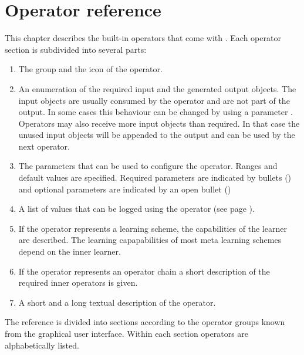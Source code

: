 \chapter{Operator reference}
\label{sec:operatorreference}

This chapter describes the built-in operators that come with
\rapidminer. Each operator section is subdivided into several parts:
\begin{enumerate}
\item The group and the icon of the operator.
\item An enumeration of the required input and the generated output
  objects. The input objects are usually consumed by the operator and
  are not part of the output. In some cases this behaviour can be changed by
  using a parameter . Operators may also receive more
  input objects than required. In that case the unused input objects will be
  appended to the output and can be used by the next operator.
\item The parameters that can be used to configure the
  operator. Ranges and default values are specified. Required parameters
  are indicated by bullets (\textbullet) and optional parameters are
  indicated by an open bullet (\textopenbullet)
\item A list of values that can be logged using the
   operator (see page \pageref{sec:op:ProcessLog}).
\item If the operator represents a learning scheme, the capabilities
  of the learner are described. The learning capapabilities of most meta
  learning schemes depend on the inner learner.
\item If the operator represents an operator chain a short description of the
  required inner operators is given.
\item A short and a long textual description of the operator.
\end{enumerate}

The reference is divided into sections according to the operator groups known
from the graphical user interface. Within each section operators are
alphabetically listed.



\pagebreak




